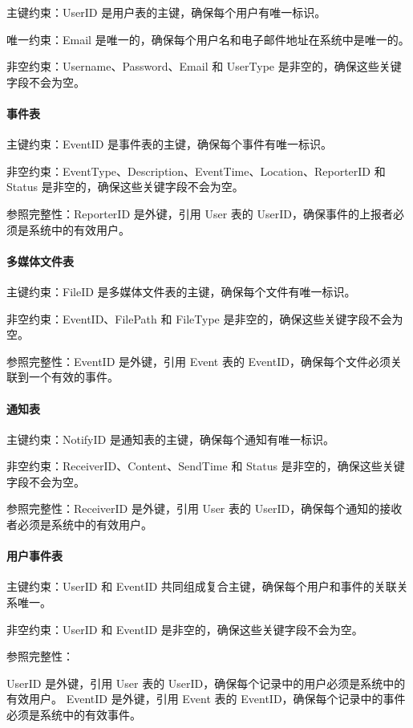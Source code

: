 主键约束：UserID 是用户表的主键，确保每个用户有唯一标识。

唯一约束：Email 是唯一的，确保每个用户名和电子邮件地址在系统中是唯一的。

非空约束：Username、Password、Email 和 UserType 是非空的，确保这些关键字段不会为空。

\paragraph{事件表}

主键约束：EventID 是事件表的主键，确保每个事件有唯一标识。

非空约束：EventType、Description、EventTime、Location、ReporterID 和 Status 是非空的，确保这些关键字段不会为空。

参照完整性：ReporterID 是外键，引用 User 表的 UserID，确保事件的上报者必须是系统中的有效用户。

\paragraph{多媒体文件表}

主键约束：FileID 是多媒体文件表的主键，确保每个文件有唯一标识。

非空约束：EventID、FilePath 和 FileType 是非空的，确保这些关键字段不会为空。

参照完整性：EventID 是外键，引用 Event 表的 EventID，确保每个文件必须关联到一个有效的事件。

\paragraph{通知表}

主键约束：NotifyID 是通知表的主键，确保每个通知有唯一标识。

非空约束：ReceiverID、Content、SendTime 和 Status 是非空的，确保这些关键字段不会为空。

参照完整性：ReceiverID 是外键，引用 User 表的 UserID，确保每个通知的接收者必须是系统中的有效用户。

\paragraph{用户事件表}

主键约束：UserID 和 EventID 共同组成复合主键，确保每个用户和事件的关联关系唯一。

非空约束：UserID 和 EventID 是非空的，确保这些关键字段不会为空。

参照完整性：

UserID 是外键，引用 User 表的 UserID，确保每个记录中的用户必须是系统中的有效用户。
EventID 是外键，引用 Event 表的 EventID，确保每个记录中的事件必须是系统中的有效事件。
